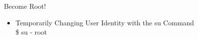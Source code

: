 \documentclass{beamer}
\begin{document}
\begin{frame}{Become Root!}
\begin{itemize}
\item Temporarily Changing User Identity with the su Command\\
\$ su - root
\end{itemize}
\end{frame}


\end{document}
